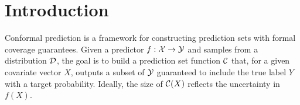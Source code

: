 \section{Introduction}


\begin{comment}
Core idea: group conditional conformal prediction. 


Structure:
\begin{enumerate}
    \item motivation: conformal prediction, uncertainty quantification, important ..., conditioning, not enough for conditional and class-conditional, concrete example (Konstantina)
    
    \item contribution: core contribution is 1) general overlapping group conditional conformal prediction (formulation); 2) reconciling statistical and computational efficiency. split conformal prediction, what we do, it is more computationally efficient; full conformal prediction, the other way; 3) implications for distribution shift; 
    (Jiayun)

    \item 3 bullet points: 1) split 2) full (comparing to previous papers) 3) distributiuon shifts 4) experiments (Jiayun)

    \item related work (Konstantina)
\end{enumerate}
\end{comment}



Conformal prediction \citep{AlgorithmicLearning2005, LW14, papadopoulos2002inductive} is a framework for constructing prediction sets with formal coverage guarantees. Given a predictor $f: \cal X \to \cal Y$ and samples from a distribution $\cal D$, the goal is to build a prediction set function ${\cal C}$ that, for a given covariate vector $X$, outputs a subset of $\cal Y$ guaranteed to include the true label $Y$ with a target probability. Ideally, the size of ${\cal C}(X)$ reflects the uncertainty in $f(X)$.


